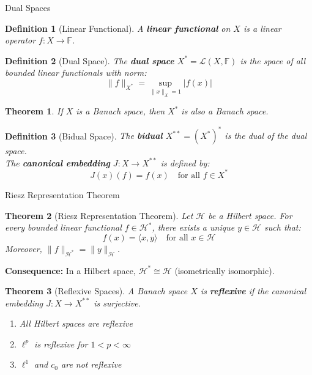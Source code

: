 \documentclass[aspectratio=169,10pt]{beamer}
\newtheorem{defn}{Definition}
\newtheorem{thm}{Theorem}
\begin{document}
\begin{frame}{Dual Spaces}
  \begin{defn}[Linear Functional]
    A \textbf{linear functional} on $X$ is a linear operator $f: X \to \mathbb{F}$.
  \end{defn}

  \vspace{0.3cm}
  \begin{defn}[Dual Space]
    The \textbf{dual space} $X^* = \mathcal{L}(X, \mathbb{F})$ is the space of all bounded linear functionals with norm:
    \[
    \|f\|_{X^*} = \sup_{\|x\|_X = 1} |f(x)|
    \]
  \end{defn}

  \vspace{0.3cm}
  \begin{thm}
    If $X$ is a Banach space, then $X^*$ is also a Banach space.
  \end{thm}

  \vspace{0.3cm}
  \begin{defn}[Bidual Space]
    The \textbf{bidual} $X^{**} = (X^*)^*$ is the dual of the dual space. \\
    The \textbf{canonical embedding} $J: X \to X^{**}$ is defined by:
    \[
    J(x)(f) = f(x) \quad \text{for all } f \in X^*
    \]
  \end{defn}
\end{frame}

\begin{frame}{Riesz Representation Theorem}
  \begin{thm}[Riesz Representation Theorem]
    Let $\mathcal{H}$ be a Hilbert space. For every bounded linear functional $f \in \mathcal{H}^*$, there exists a unique $y \in \mathcal{H}$ such that:
    \[
    f(x) = \langle x, y \rangle \quad \text{for all } x \in \mathcal{H}
    \]
    Moreover, $\|f\|_{\mathcal{H}^*} = \|y\|_{\mathcal{H}}$.
  \end{thm}

  \vspace{0.3cm}
  \textbf{Consequence:} In a Hilbert space, $\mathcal{H}^* \cong \mathcal{H}$ (isometrically isomorphic).

  \vspace{0.3cm}
  \begin{thm}[Reflexive Spaces]
    A Banach space $X$ is \textbf{reflexive} if the canonical embedding $J: X \to X^{**}$ is surjective.
    \begin{enumerate}
      \item All Hilbert spaces are reflexive
      \item $\ell^p$ is reflexive for $1 < p < \infty$
      \item $\ell^1$ and $c_0$ are not reflexive
    \end{enumerate}
  \end{thm}
\end{frame}
\end{document}
